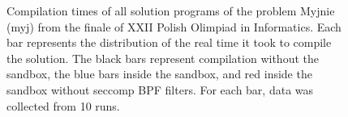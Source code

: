 \documentclass[en]{pracamgr}
\begin{document}
\begin{appendices}
\begin{figure}[H]
\caption{Compilation times of all solution programs of the problem Myjnie (myj) from the finale of XXII Polish Olimpiad in Informatics. Each bar represents the distribution of the real time it took to compile the solution. The black bars represent compilation without the sandbox, the blue bars inside the sandbox, and red inside the sandbox without seccomp BPF filters. For each bar, data was collected from 10 runs.}
\label{figure:myj_compilation_real_time}
\end{figure}


\end{appendices}
\end{document}
